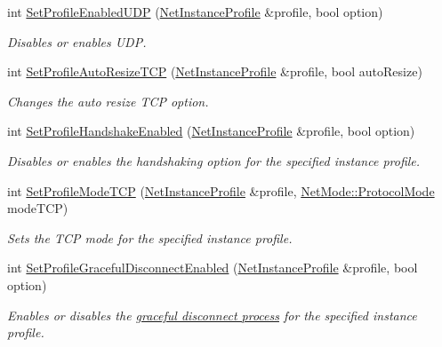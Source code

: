 \begin{DoxyCompactItemize}
int \hyperlink{namespacemn_a4ab287e14e0b6bc85f580ce81b756261}{SetProfileEnabledUDP} (\hyperlink{class_net_instance_profile}{NetInstanceProfile} \&profile, bool option)
\begin{DoxyCompactList}\small\item\em Disables or enables UDP. \item\end{DoxyCompactList}\item 
int \hyperlink{namespacemn_a8119c03dd576a92ae38d126c56595f60}{SetProfileAutoResizeTCP} (\hyperlink{class_net_instance_profile}{NetInstanceProfile} \&profile, bool autoResize)
\begin{DoxyCompactList}\small\item\em Changes the auto resize TCP option. \item\end{DoxyCompactList}\item 
int \hyperlink{namespacemn_a7c1a4cfa1663b13abfaed2b1b8476780}{SetProfileHandshakeEnabled} (\hyperlink{class_net_instance_profile}{NetInstanceProfile} \&profile, bool option)
\begin{DoxyCompactList}\small\item\em Disables or enables the handshaking option for the specified instance profile. \item\end{DoxyCompactList}\item 
int \hyperlink{namespacemn_ae56c4d95f9ecc254b04cccd03f4a8a88}{SetProfileModeTCP} (\hyperlink{class_net_instance_profile}{NetInstanceProfile} \&profile, \hyperlink{class_net_mode_a43cfa55ee6a4db66a8d7d6c27f766964}{NetMode::ProtocolMode} modeTCP)
\begin{DoxyCompactList}\small\item\em Sets the TCP mode for the specified instance profile. \item\end{DoxyCompactList}\item 
int \hyperlink{namespacemn_acd97640f8602438193812c272b829dd1}{SetProfileGracefulDisconnectEnabled} (\hyperlink{class_net_instance_profile}{NetInstanceProfile} \&profile, bool option)
\begin{DoxyCompactList}\small\item\em Enables or disables the \hyperlink{graceful_disconnect_page}{graceful disconnect process} for the specified instance profile. \item\end{DoxyCompactList}\item 

\end{DoxyCompactItemize}
